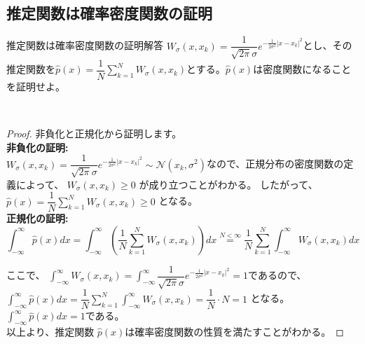 \subsection{推定関数は確率密度関数の証明}
\begin{reidai}{推定関数は確率密度関数の証明}{解答}
  $W_{\sigma}(x,x_k)=\dfrac{1}{\sqrt{2\pi}\sigma} e^{-\frac{1}{2\sigma^2}|x-x_k|^2}  $とし、その推定関数を$\hat{p}(x)=\displaystyle\dfrac{1}{N}\sum_{k=1}^{N}W_{\sigma}(x,x_k)$とする。$\hat{p}(x)$は密度関数になることを証明せよ。
\end{reidai}
\kai \\

\noindent
\begin{proof}
  非負化と正規化から証明します。\\

\noindent
\textbf{\large 非負化の証明:}\\

$W_{\sigma}(x,x_k)=\dfrac{1}{\sqrt{2\pi}\sigma} e^{-\frac{1}{2\sigma^2}|x-x_k|^2} \sim \mathcal{N}(x_k,\sigma^2)$なので、正規分布の密度関数の定義によって、 $ W_{\sigma}(x,x_k) \geq 0$ が成り立つことがわかる。
したがって、 $ \hat{p}(x)=\displaystyle\dfrac{1}{N}\sum_{k=1}^{N}W_{\sigma}(x,x_k) \geq 0 $ となる。\\

\noindent
\textbf{\large 正規化の証明:}\\

\noindent
$$
\int_{-\infty}^{\infty} \hat{p}(x) dx = \int_{-\infty}^{\infty} \left( \dfrac{1}{N}\sum_{k=1}^{N}W_{\sigma}(x,x_k) \right) dx \overset{N<\infty}{=} \dfrac{1}{N}\sum_{k=1}^{N} \int_{-\infty}^{\infty} W_{\sigma}(x,x_k) dx
$$

\noindent
ここで、 $ \displaystyle\int_{-\infty}^{\infty} W_{\sigma}(x,x_k) =\int_{-\infty}^{\infty} \dfrac{1}{\sqrt{2\pi}\sigma}e^{-\frac{1}{2\sigma^2} |x-x_k|^2}=1$であるので、
$ \displaystyle\int_{-\infty}^{\infty} \hat{p}(x) dx=\displaystyle\dfrac{1}{N}\sum_{k=1}^{N}\int_{-\infty}^{\infty}W_{\sigma}(x,x_k)=\dfrac{1}{N}\cdot N= 1$ となる。\ie $\displaystyle\int_{-\infty}^{\infty} \hat{p} (x) dx = 1$である。\\

\noindent
以上より、推定関数 $ \hat{p}(x) $は確率密度関数の性質を満たすことがわかる。
\end{proof}